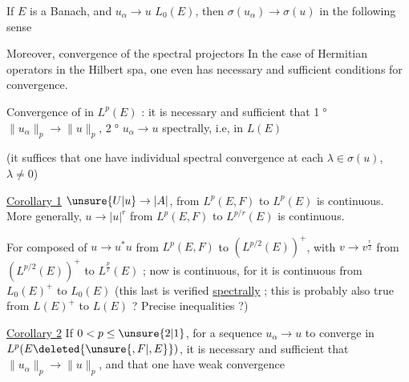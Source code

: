 If $E$ is a Banach, and $u_\alpha\to u$  $L_0(E)$, then $\sigma(u_\alpha)\to\sigma(u)$ in the following sense

Moreover, convergence of the spectral projectors  In the case of Hermitian operators in the Hilbert spa, one even has  necessary and sufficient conditions for convergence.

Convergence of   in $L^p(E)$ : it is necessary and sufficient that \textcircled{\scriptsize 1°} $\|u_\alpha\|_p\to\|u\|_p$, \textcircled{\scriptsize 2°} $u_\alpha\to u$ spectrally, i.e, in $L(E)$

(it  suffices that one have individual spectral convergence at each $\lambda\in\sigma(u)$, $\lambda\neq0$)

\uline{Corollary 1} $\unsure{U|u}\to|A|$, from $L^p(E,F)$ to $L^p(E)$ is continuous. More generally, $u\to|u|^r$ from $L^p(E,F)$ to $L^{p/r}(E)$ is continuous.

For composed of $u\to u^*u$ from $L^p(E,F)$ to $(L^{p/2}(E))^+$, with $v\to v^{\frac r2}$ from $(L^{p/2}(E))^+$ to $L^{\frac pr}(E)$ ; now   is continuous, for it is continuous from $L_0(E)^+$ to $L_0(E)$ (this last  is verified \uline{spectrally} ; this is probably also true from $L(E)^+$ to $L(E)$ ? Precise inequalities ?)

\uline{Corollary 2} If $0<p\leq\unsure{2|1}$, for a sequence  $u_\alpha\to u$ to converge in $L^p(E\deleted{\unsure{,F|,E}})$, it is necessary and sufficient that $\|u_\alpha\|_p\to\|u\|_p$, and that one have weak convergence
